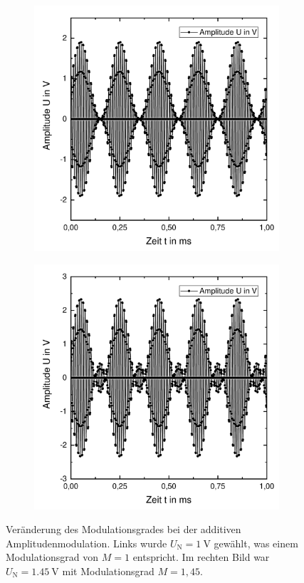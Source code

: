 \documentclass[a4paper,twoside,final]{article}
\begin{document}
\begin{figure}[htp]
    \centering
    \begin{subfigure}{0.45\textwidth}
        \includegraphics[width=\textwidth]{Bilder/AM2_additiv_Zeit.pdf}
    \end{subfigure}
    \begin{subfigure}{0.45\textwidth}
        \includegraphics[width=\textwidth]{Bilder/AM3_additiv_Zeit.pdf}
    \end{subfigure}
    \caption{Veränderung des Modulationsgrades bei der additiven Amplitudenmodulation. Links wurde $U_\text{N} = \SI{1}{\volt}$ gewählt, was einem Modulationsgrad von $M = 1$ entspricht. Im rechten Bild war $U_\text{N} = \SI{1,45}{\volt}$ mit Modulationsgrad $M = 1,45$.}
    \label{fig:AM2_additiv}
\end{figure}\\
\end{document}
